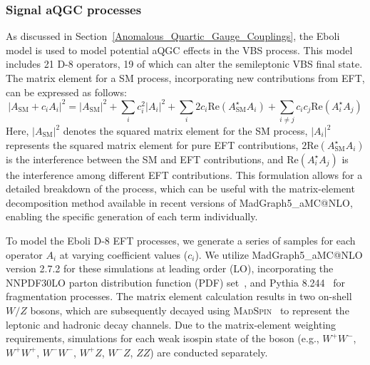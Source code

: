 \clearpage
\subsubsection{Signal aQGC processes}
\label{subsec:agc_sample}

As discussed in Section~\ref{Anomalous_Quartic_Gauge_Couplings}, the Eboli model is used to model potential aQGC effects in the VBS process. This model includes 21 D-8 operators, 19 of which can alter the semileptonic VBS final state.
The matrix element for a SM process, incorporating new contributions from EFT, can be expressed as follows:
\begin{equation}
  |A_{\text{SM}} + c_i A_i|^2 = |A_{\text{SM}}|^2 + \sum\limits_i c_i^2 |A_i|^2 + \sum\limits_i 2 c_i \mathrm{Re}(A_{\text{SM}}^\star A_i) + \sum\limits_{i \neq j} c_i c_j \mathrm{Re}(A_i^\star A_j)
\end{equation}
Here, $|A_{\text{SM}}|^2$ denotes the squared matrix element for the SM process, $|A_i|^2$ represents the squared matrix element for pure EFT contributions, $2 \mathrm{Re}(A_{\text{SM}}^\star A_i)$ is the interference between the SM and EFT contributions, and $\mathrm{Re}(A_i^\star A_j)$ is the interference among different EFT contributions. This formulation allows for a detailed breakdown of the process, which can be useful with the matrix-element decomposition method available in recent versions of MadGraph5\_aMC@NLO, enabling the specific generation of each term individually.

To model the Eboli D-8 EFT processes, we generate a series of samples for each operator \(A_i\) at varying coefficient values (\(c_i\)). We utilize MadGraph5\_aMC@NLO version 2.7.2 for these simulations at leading order (LO), incorporating the NNPDF30LO parton distribution function (PDF) set~\cite{Ball:2012cx}, and Pythia 8.244~\cite{Sjostrand:2007gs} for fragmentation processes. The matrix element calculation results in two on-shell \(W/Z\) bosons, which are subsequently decayed using \textsc{MadSpin}~\cite{Artoisenet:2012st} to represent the leptonic and hadronic decay channels. Due to the matrix-element weighting requirements, simulations for each weak isospin state of the boson (e.g., \(W^+W^-\), \(W^+W^+\), \(W^-W^-\), \(W^+Z\), \(W^-Z\), \(ZZ\)) are conducted separately.


  

